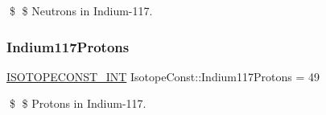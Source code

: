 \$ \$ Neutrons in Indium-\/117. \mbox{\label{group___isotope_const-_indium-_in117_ga2eff13d53b5acde93dd5d29478a8bd5a}} 
\subsubsection{\texorpdfstring{Indium117\+Protons}{Indium117Protons}}
{\footnotesize\ttfamily \mbox{\hyperlink{group___isotope_const-_macros_ga5f18360b3e99483a35c32d789e62621c}{I\+S\+O\+T\+O\+P\+E\+C\+O\+N\+S\+T\+\_\+\+I\+NT}} Isotope\+Const\+::\+Indium117\+Protons = 49}

\$ \$ Protons in Indium-\/117. 
